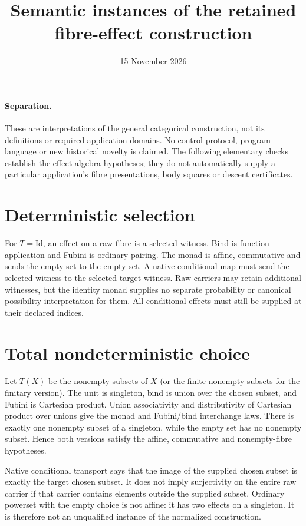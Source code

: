 \documentclass{article}
\title{Semantic instances of the retained fibre-effect construction}
\date{15 November 2026}
\begin{document}
\maketitle
\paragraph{Separation.} These are interpretations of the general categorical construction, not its definitions or required application domains. No control protocol, program language or new historical novelty is claimed. The following elementary checks establish the effect-algebra hypotheses; they do not automatically supply a particular application's fibre presentations, body squares or descent certificates.

\section{Deterministic selection}
For $T=\mathrm{Id}$, an effect on a raw fibre is a selected witness. Bind is function application and Fubini is ordinary pairing. The monad is affine, commutative and sends the empty set to the empty set. A native conditional map must send the selected witness to the selected target witness. Raw carriers may retain additional witnesses, but the identity monad supplies no separate probability or canonical possibility interpretation for them. All conditional effects must still be supplied at their declared indices.

\section{Total nondeterministic choice}
Let $T(X)$ be the nonempty subsets of $X$ (or the finite nonempty subsets for the finitary version). The unit is singleton, bind is union over the chosen subset, and Fubini is Cartesian product. Union associativity and distributivity of Cartesian product over unions give the monad and Fubini/bind interchange laws. There is exactly one nonempty subset of a singleton, while the empty set has no nonempty subset. Hence both versions satisfy the affine, commutative and nonempty-fibre hypotheses.

Native conditional transport says that the image of the supplied chosen subset is exactly the target chosen subset. It does not imply surjectivity on the entire raw carrier if that carrier contains elements outside the supplied subset. Ordinary powerset with the empty choice is not affine: it has two effects on a singleton. It is therefore not an unqualified instance of the normalized construction.
\end{document}
